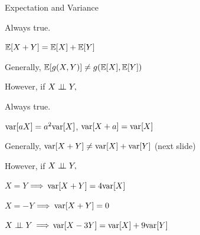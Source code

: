 \begin{frame}{Expectation and Variance}

{
\plitemsep 0.05in
\bci 

\item<1-> Always true. 

$\mathbb{E}[ X+Y ] = \mathbb{E}[ X ] + \mathbb{E}[ Y ]$

\item<2-> Generally,
$\mathbb{E}[ g(X,Y) ] \neq g(\mathbb{E}[ X ],\mathbb{E}[ Y ])$

\medskip

\item<3-> However, if $X \perp \!\!\! \perp Y,$
\item<4-> 

\eci
}
{
\plitemsep 0.1in
\bci 

\item<5-> Always true. 

$\text{var}[ aX ] = a^2 \text{var}[ X ]$, $\text{var}[ X + a ] = \text{var}[ X ]$

\item<6-> Generally,
$\text{var}[ X+Y ] \neq \text{var}[ X ] + \text{var}[ Y ]$ (next slide)

\medskip

\item<7-> However, if $X \perp \!\!\! \perp Y,$

\item<7-> 

\plitemsep 0.02in
\bci
\item<8-> $X=Y$ $\Longrightarrow$ $\text{var}[ X+Y ] = 4 \text{var}[ X ]$
\item<9-> $X=-Y$ $\Longrightarrow$ $\text{var}[ X+Y ] = 0$
\item<10-> $X \perp \!\!\! \perp Y$ $\Longrightarrow$ $\text{var}[ X-3Y ] = \text{var}[ X ] + 9 \text{var}[ Y ]$
\eci

\eci

}
\end{frame}



